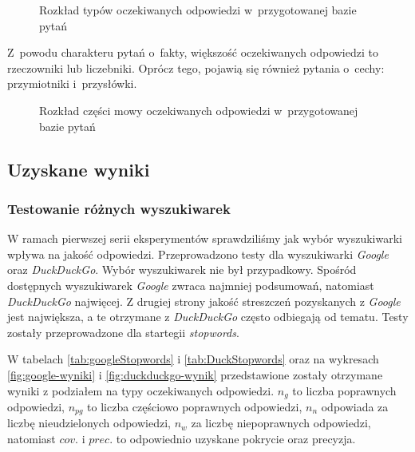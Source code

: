 \begin{figure}[h!]
    \label{fig:rozklad-typow-odpowiedzi}  
    \caption{Rozkład typów oczekiwanych odpowiedzi w~przygotowanej bazie pytań}
\end{figure}

Z~powodu charakteru pytań o~fakty, większość oczekiwanych odpowiedzi to rzeczowniki lub liczebniki. Oprócz tego, pojawią się również pytania o~cechy: przymiotniki i~przysłówki.

\begin{figure}[h!]
    \label{fig:rozklad-typow-odpowiedzi2}  
    \caption{Rozkład części mowy oczekiwanych odpowiedzi w~przygotowanej bazie pytań}
\end{figure}

\subsection{Uzyskane wyniki}

\subsubsection{Testowanie różnych wyszukiwarek}
W ramach pierwszej serii eksperymentów sprawdziliśmy jak wybór wyszukiwarki wpływa na jakość odpowiedzi. Przeprowadzono testy dla wyszukiwarki \textit{Google} oraz \textit{DuckDuckGo}. Wybór wyszukiwarek nie był przypadkowy. Spośród dostępnych wyszukiwarek \textit{Google} zwraca najmniej podsumowań, natomiast \textit{DuckDuckGo} najwięcej. Z drugiej strony jakość streszczeń pozyskanych z \textit{Google} jest największa, a te otrzymane z \textit{DuckDuckGo} często odbiegają od tematu. Testy zostały przeprowadzone dla startegii \textit{stopwords}.

W tabelach \ref{tab:googleStopwords} i \ref{tab:DuckStopwords} oraz na wykresach \ref{fig:google-wyniki} i \ref{fig:duckduckgo-wynik} przedstawione zostały otrzymane wyniki z podziałem na typy oczekiwanych odpowiedzi. $n_g$ to liczba poprawnych odpowiedzi, $n_{pg}$ to liczba częściowo poprawnych odpowiedzi, $n_n$ odpowiada za liczbę nieudzielonych odpowiedzi, $n_w$ za liczbę niepoprawnych odpowiedzi, natomiast $cov.$ i $prec.$ to odpowiednio uzyskane pokrycie oraz precyzja.

